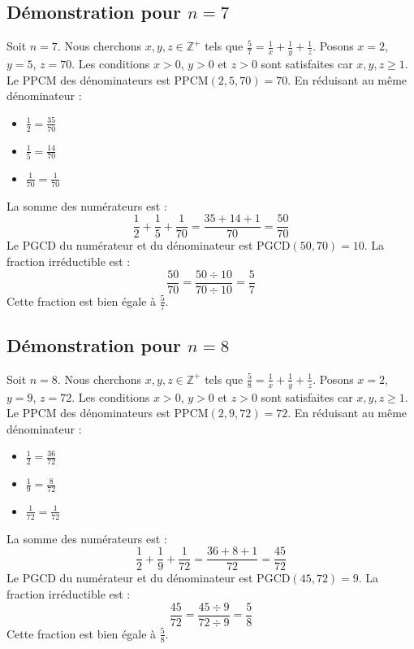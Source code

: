 \documentclass[11pt,a4paper]{article}
\begin{document}
\subsection{Démonstration pour $n = 7$}
Soit $n = 7$. Nous cherchons $x, y, z \in \mathbb{Z}^{+}$ tels que $\frac{5}{7} = \frac{1}{x} + \frac{1}{y} + \frac{1}{z}$.
Posons $x = 2$, $y = 5$, $z = 70$.
Les conditions $x > 0$, $y > 0$ et $z > 0$ sont satisfaites car $x, y, z \geq 1$.
Le PPCM des dénominateurs est $\text{PPCM}(2, 5, 70) = 70$.
En réduisant au même dénominateur :
\begin{itemize}
    \item $\frac{1}{2} = \frac{35}{70}$
    \item $\frac{1}{5} = \frac{14}{70}$
    \item $\frac{1}{70} = \frac{1}{70}$
\end{itemize}
La somme des numérateurs est :
$$ \frac{1}{2} + \frac{1}{5} + \frac{1}{70} = \frac{35 + 14 + 1}{70} = \frac{50}{70} $$
Le PGCD du numérateur et du dénominateur est $\text{PGCD}(50, 70) = 10$.
La fraction irréductible est :
$$ \frac{50}{70} = \frac{50 \div 10}{70 \div 10} = \frac{5}{7} $$
Cette fraction est bien égale à $\frac{5}{7}$.

\subsection{Démonstration pour $n = 8$}
Soit $n = 8$. Nous cherchons $x, y, z \in \mathbb{Z}^{+}$ tels que $\frac{5}{8} = \frac{1}{x} + \frac{1}{y} + \frac{1}{z}$.
Posons $x = 2$, $y = 9$, $z = 72$.
Les conditions $x > 0$, $y > 0$ et $z > 0$ sont satisfaites car $x, y, z \geq 1$.
Le PPCM des dénominateurs est $\text{PPCM}(2, 9, 72) = 72$.
En réduisant au même dénominateur :
\begin{itemize}
    \item $\frac{1}{2} = \frac{36}{72}$
    \item $\frac{1}{9} = \frac{8}{72}$
    \item $\frac{1}{72} = \frac{1}{72}$
\end{itemize}
La somme des numérateurs est :
$$ \frac{1}{2} + \frac{1}{9} + \frac{1}{72} = \frac{36 + 8 + 1}{72} = \frac{45}{72} $$
Le PGCD du numérateur et du dénominateur est $\text{PGCD}(45, 72) = 9$.
La fraction irréductible est :
$$ \frac{45}{72} = \frac{45 \div 9}{72 \div 9} = \frac{5}{8} $$
Cette fraction est bien égale à $\frac{5}{8}$.
\end{document}
